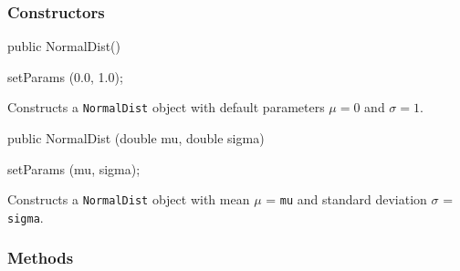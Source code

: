 \subsubsection* {Constructors}

\begin{code}

   public NormalDist()\begin{hide} {
      setParams (0.0, 1.0);
   }\end{hide}
\end{code}
\begin{tabb}
 Constructs a \texttt{NormalDist} object with default parameters $\mu = 0$
 and $\sigma = 1$.
  \end{tabb}
\begin{code}

   public NormalDist (double mu, double sigma)\begin{hide} {
      setParams (mu, sigma);
   }\end{hide}
\end{code}
\begin{tabb}
 Constructs a \texttt{NormalDist} object with mean $\mu$ = \texttt{mu}
 and standard deviation $\sigma$ = \texttt{sigma}.
  \end{tabb}

\subsubsection* {Methods}

